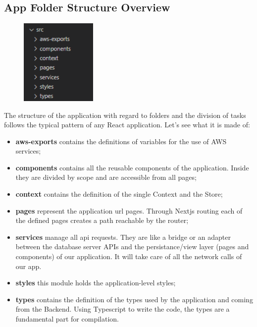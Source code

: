 \subsection{App Folder Structure Overview} \label{_folder}

\begin{figure}[H]
    \centering
    \includegraphics[width=10em]{res/images/frontend-diagrams/app-folder-structure.png}
\end{figure}

The structure of the application with regard to folders and the division of tasks follows the typical pattern of any React application. Let's see what it is made of:

\begin{itemize}
    \item \textbf{aws-exports} contains the definitions of variables for the use of AWS services;
    \item \textbf{components} contains all the reusable components of the application. Inside they are divided by scope and are accessible from all pages;
    \item \textbf{context} contains the definition of the single Context and the Store;
    \item \textbf{pages} represent the application url pages. Through Nextjs routing each of the defined pages creates a path reachable by the router;
    \item \textbf{services} manage all api requests. They are like a bridge or an adapter between the database server APIs and the persistance/view layer (pages and components) of our application. It will take care of all the network calls of our app.
    \item \textbf{styles} this module holds the application-level styles;
    \item \textbf{types} contains the definition of the types used by the application and coming from the Backend. Using Typescript to write the code, the types are a fundamental part for compilation.
\end{itemize}